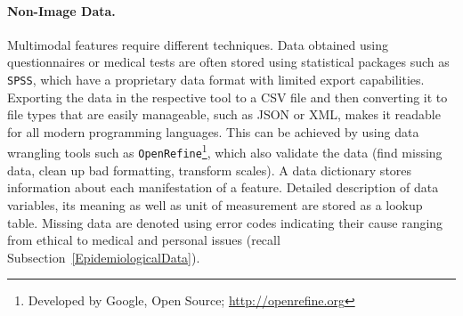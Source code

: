 \documentclass[journal]{style/vgtc} 			          %
\begin{document}
\paragraph{Non-Image Data. }
%
Multimodal features require different techniques.
%
Data obtained using questionnaires or medical tests are often stored using statistical packages such as \texttt{SPSS}, which have a proprietary data format with limited export capabilities.
%
Exporting the data in the respective tool to a CSV file and then converting it to file types that are easily manageable, such as JSON or XML, makes it readable for all modern programming languages.
%
This can be achieved by using data wrangling tools such as \texttt{OpenRefine}\footnote{Developed by Google, Open Source; \url{http://openrefine.org}}, which also validate the data (find missing data, clean up bad formatting, transform scales).
%
A data dictionary stores information about each manifestation of a feature.
%
Detailed description of data variables, its meaning as well as unit of measurement are stored as a lookup table.
%
Missing data are denoted using error codes indicating their cause ranging from ethical to medical and personal issues (recall Subsection~\ref{EpidemiologicalData}).
%
\end{document}
